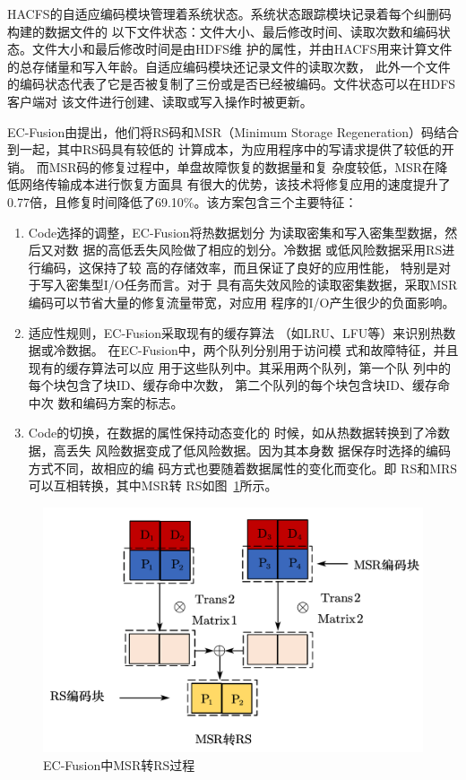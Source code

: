 HACFS的自适应编码模块管理着系统状态。系统状态跟踪模块记录着每个纠删码构建的数据文件的
以下文件状态：文件大小、最后修改时间、读取次数和编码状态。文件大小和最后修改时间是由HDFS维
护的属性，并由HACFS用来计算文件的总存储量和写入年龄。自适应编码模块还记录文件的读取次数，
此外一个文件的编码状态代表了它是否被复制了三份或是否已经被编码。文件状态可以在HDFS客户端对
该文件进行创建、读取或写入操作时被更新。


EC-Fusion由\citet{qiu2020ec}提出，他们将RS码和MSR（Minimum Storage
Regeneration）码结合到一起，其中RS码具有较低的
计算成本，为应用程序中的写请求提供了较低的开销。
而MSR码的修复过程中，单盘故障恢复的数据量和复
杂度较低，MSR在降低网络传输成本进行恢复方面具
有很大的优势，该技术将修复应用的速度提升了0.77倍，且修复时间降低了69.10\%。该方案包含三个主要特征：

\begin{enumerate}
    \item Code选择的调整，EC-Fusion将热数据划分
            为读取密集和写入密集型数据，然后又对数
            据的高低丢失风险做了相应的划分。冷数据
            或低风险数据采用RS进行编码，这保持了较
            高的存储效率，而且保证了良好的应用性能，
            特别是对于写入密集型I/O任务而言。对于
            具有高失效风险的读取密集数据，采取MSR
            编码可以节省大量的修复流量带宽，对应用
            程序的I/O产生很少的负面影响。
    \item 适应性规则，EC-Fusion采取现有的缓存算法
            （如LRU、LFU等）来识别热数据或冷数据。
            在EC-Fusion中，两个队列分别用于访问模
            式和故障特征，并且现有的缓存算法可以应
            用于这些队列中。其采用两个队列，第一个队
            列中的每个块包含了块ID、缓存命中次数，
            第二个队列的每个块包含块ID、缓存命中次
            数和编码方案的标志。
    \item Code的切换，在数据的属性保持动态变化的
            时候，如从热数据转换到了冷数据，高丢失
            风险数据变成了低风险数据。因为其本身数
            据保存时选择的编码方式不同，故相应的编
            码方式也要随着数据属性的变化而变化。即
            RS和MRS可以互相转换，其中MSR转
            RS如图~\ref{fig:con-2.7}所示。
\end{enumerate}

\begin{figure}[htbp]
	\centering
	\includegraphics [scale=0.5]{figures/2.7.pdf}
	\caption{EC-Fusion中MSR转RS过程}
	\label{fig:con-2.7}
\end{figure}

